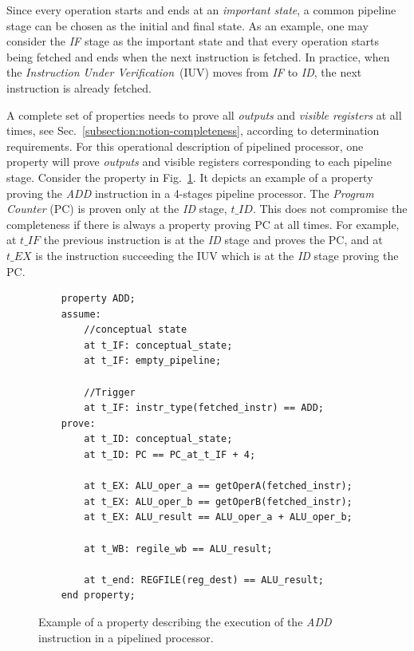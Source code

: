 Since every operation starts and ends at an \textit{important state}, a common pipeline stage can be chosen as the initial and final state. As an example, one may consider the \textit{IF} stage as the important state and that every operation starts being fetched and ends when the next instruction is fetched. In practice, when the \textit{Instruction Under Verification}~(IUV) moves from \textit{IF} to \textit{ID}, the next instruction is already fetched.

A complete set of properties needs to prove all \textit{outputs} and \textit{visible registers} at all times, see Sec.~\ref{subsection:notion-completeness}, according to determination requirements. For this operational description of pipelined processor, one property will prove \textit{outputs} and visible registers corresponding to each pipeline stage. Consider the property in Fig.~\ref{fig:ex-add-ppt}. It depicts an example of a property proving the \textit{ADD} instruction in a 4-stages pipeline processor. The \textit{Program Counter} (PC) is proven only at the \textit{ID} stage, $t\_ID$. This does not compromise the completeness if there is always a property proving PC at all times. For example, at $t\_IF$ the previous instruction is at the \textit{ID} stage and proves the PC, and at $t\_EX$ is the instruction succeeding the IUV which is at the \textit{ID} stage proving the PC.

\begin{figure}[htb!]
    \begin{lstlisting}
    property ADD;
    assume:
        //conceptual state
        at t_IF: conceptual_state;
        at t_IF: empty_pipeline;
    
        //Trigger
        at t_IF: instr_type(fetched_instr) == ADD;
    prove:
        at t_ID: conceptual_state;
        at t_ID: PC == PC_at_t_IF + 4;
    
        at t_EX: ALU_oper_a == getOperA(fetched_instr);
        at t_EX: ALU_oper_b == getOperB(fetched_instr);
        at t_EX: ALU_result == ALU_oper_a + ALU_oper_b;
        
        at t_WB: regile_wb == ALU_result;
    
        at t_end: REGFILE(reg_dest) == ALU_result;
    end property;\end{lstlisting}
    \caption{Example of a property describing the execution of the \textit{ADD} instruction in a pipelined processor.}
    \label{fig:ex-add-ppt}
\end{figure}

